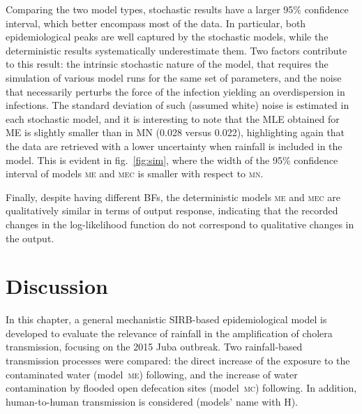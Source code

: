 Comparing the two model types, stochastic results have a larger 95\% confidence interval, which better encompass most of the data. In particular, both epidemiological peaks are well captured by the stochastic models, while the deterministic results systematically underestimate them. Two factors contribute to this result: the intrinsic stochastic nature of the model, that requires the simulation of various model runs for the same set of parameters, and the noise that necessarily perturbs the force of the infection yielding an overdispersion in infections. The standard deviation of such (assumed white) noise is estimated in each stochastic model, and it is interesting to note that the MLE obtained for \textsc{ME} is slightly smaller than in \textsc{MN} (0.028 versus 0.022), highlighting again that the data are retrieved with a lower uncertainty when rainfall is included in the model. This is evident in fig.~\ref{fig:sim}, where the width of the 95\% confidence interval of models \textsc{me} and \textsc{mec} is smaller with respect to \textsc{mn}.

Finally, despite having different BFs, the deterministic models \textsc{me} and \textsc{mec} are qualitatively similar in terms of output response, indicating that the recorded changes in the log-likelihood function do not correspond to qualitative changes in the output.

\section{Discussion}
\label{sec:disc}


In this chapter, a general mechanistic SIRB-based epidemiological model is developed to evaluate the relevance of rainfall in the amplification of cholera transmission, focusing on the 2015 Juba outbreak. Two rainfall-based transmission processes were compared: the direct increase of the exposure to the contaminated water (model~\textsc{me}) following\cite{Eisenberg:ExaminingRainfallCholera:2013}, and the increase of water contamination by flooded open defecation sites (model~\textsc{mc}) following\cite{Rinaldo:Reassessment20102011:2012}. In addition, human-to-human transmission is considered (models' name with \textsc{H}).

